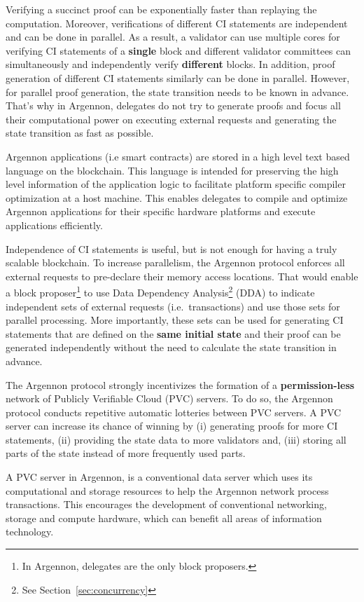 Verifying a succinct proof can be exponentially faster than replaying the computation. Moreover, verifications of
different CI statements are independent and can be done in parallel. As a result, a validator can use multiple cores for
verifying CI statements of a \textbf{single} block and different validator committees can simultaneously and
independently verify \textbf{different} blocks.
In addition, proof generation of different CI statements similarly can be done in parallel. However, for parallel
proof generation, the state transition needs to be known in advance. That's why in Argennon, delegates do not try
to generate proofs and focus all their computational power on executing external requests and
generating the state transition as fast as possible.

Argennon applications (i.e smart contracts) are stored in a high level text based language on the blockchain. This
language is intended for preserving the
high level information of the application logic to facilitate platform specific compiler optimization at a host
machine. This enables delegates to compile and optimize Argennon applications for their specific hardware platforms
and execute applications efficiently.

Independence of CI statements is useful, but is not enough for having a truly scalable blockchain. To increase
parallelism, the Argennon protocol enforces all external requests to pre-declare their memory access locations. That
would enable a block proposer\footnote{In Argennon, delegates are the only block proposers.} to use Data Dependency
Analysis\footnote{See Section~\ref{sec:concurrency}} (DDA) to indicate independent sets of external requests (i.e.\
transactions) and use those sets for parallel processing. More importantly, these sets can be used for generating CI
statements that are defined on the \textbf{same initial state} and their proof can be generated independently without
the need to calculate the state transition in advance.

The Argennon protocol strongly incentivizes the formation of a \textbf{permission-less} network of Publicly Verifiable
Cloud (PVC) servers. To do so, the Argennon protocol conducts repetitive automatic lotteries between PVC servers.
A PVC server can increase its chance of winning by (i) generating proofs for more CI statements, (ii) providing the
state data to more validators and, (iii) storing all parts of the state instead of more frequently used parts.

A PVC server in Argennon, is a conventional data server which uses its computational and
storage resources to help the Argennon network process transactions. This encourages the development
of conventional networking, storage and compute hardware, which can benefit all areas of information technology.
